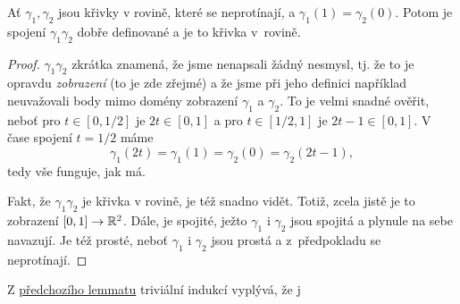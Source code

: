 \begin{lemma}
 \label{lem:spojeni-krivek}
 Ať $\gamma_1,\gamma_2$ jsou křivky v rovině, které se neprotínají, a
 $\gamma_1(1) = \gamma_2(0)$. Potom je spojení $\gamma_1\gamma_2$ dobře
 definované a je to křivka v~rovině.
\end{lemma}
\begin{proof}
  $\gamma_1\gamma_2$ zkrátka znamená, že jsme nenapsali
 žádný nesmysl, tj. že to je opravdu \emph{zobrazení} (to je zde zřejmé) a že
 jsme při jeho definici například neuvažovali body mimo domény zobrazení
 $\gamma_1$ a $\gamma_2$. To je velmi snadné ověřit, neboť pro $t \in [0,1 / 2]$
 je $2t \in [0,1]$ a pro $t \in [1 / 2,1]$ je $2t-1 \in [0,1]$. V čase spojení
 $t = 1 / 2$ máme
 \[
  \gamma_1(2t) = \gamma_1(1) = \gamma_2(0) = \gamma_2(2t - 1),
 \]
 tedy vše funguje, jak má.

 Fakt, že $\gamma_1\gamma_2$ je křivka v rovině, je též snadno vidět. Totiž,
 zcela jistě je to zobrazení $[0,1] \to \mathbb{R}^2$. Dále, je spojité, ježto
 $\gamma_1$ i $\gamma_2$ jsou spojitá a plynule na sebe navazují. Je též prosté,
 neboť $\gamma_1$ i $\gamma_2$ jsou prostá a z~předpokladu se neprotínají.
\end{proof}

Z \hyperref[lem:spojeni-krivek]{předchozího lemmatu} triviální indukcí vyplývá,
že j
